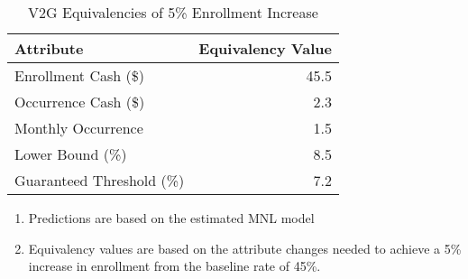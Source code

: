\begin{table}[H]
\centering
\caption{V2G Equivalencies of 5\% Enrollment Increase}
\setlength{\tabcolsep}{2.5em}

\newsavebox{\myTableBoxB}
\begin{lrbox}{\myTableBoxB}
\begin{tabular}{lr}
\toprule
\textbf{Attribute} & \textbf{Equivalency Value} \\
\midrule
Enrollment Cash (\$) & 45.5 \\
Occurrence Cash (\$) & 2.3 \\
Monthly Occurrence & 1.5 \\
Lower Bound (\%) & 8.5 \\
Guaranteed Threshold (\%) & 7.2 \\
\bottomrule
\end{tabular}
\end{lrbox}

\usebox{\myTableBoxB}

\vspace{0.5em}
\begin{minipage}{\wd\myTableBoxB}
\footnotesize
\begin{enumerate}[leftmargin=2em]  %
\item Predictions are based on the estimated MNL model
\item Equivalency values are based on the attribute changes needed to achieve a 5\% increase in enrollment from the baseline rate of 45\%.
\end{enumerate}
\end{minipage}
\label{table_v2g_equiv}
\end{table}
